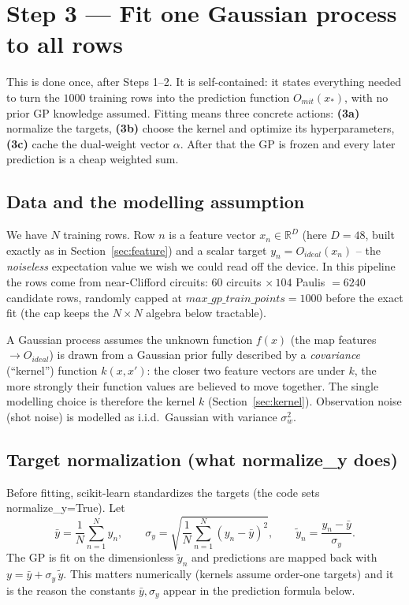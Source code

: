 \documentclass[11pt]{article}
\def\bm#1{#1}%
\def\texttt#1{#1}%
\def\mathrm#1{#1}%
\begin{document}
\section{Step 3 --- Fit one Gaussian process to all rows}
\label{sec:gp}

This is done once, after Steps 1--2. It is self-contained: it states everything
needed to turn the $1000$ training rows into the prediction function
$O_{\mathrm{mit}}(\bm x_*)$, with no prior GP knowledge assumed. Fitting means
three concrete actions: \textbf{(3a)} normalize the targets, \textbf{(3b)} choose
the kernel and optimize its hyperparameters, \textbf{(3c)} cache the dual-weight
vector $\bm\alpha$. After that the GP is frozen and every later prediction is a
cheap weighted sum.

\subsection{Data and the modelling assumption}
We have $N$ training rows. Row $n$ is a feature vector $\bm x_n\in\mathbb{R}^{D}$
(here $D=48$, built exactly as in Section~\ref{sec:feature}) and a scalar target
$y_n=O_{\mathrm{ideal}}(\bm x_n)$ -- the \emph{noiseless} expectation value we
wish we could read off the device. In this pipeline the rows come from
near-Clifford circuits: $60$ circuits $\times\,104$ Paulis $=6240$ candidate
rows, randomly capped at $\texttt{max\_gp\_train\_points}=1000$ before the exact
fit (the cap keeps the $N\times N$ algebra below tractable).

A Gaussian process assumes the unknown function $f(\bm x)$ (the map
features~$\to O_{\mathrm{ideal}}$) is drawn from a Gaussian prior fully described
by a \emph{covariance} (``kernel'') function $k(\bm x,\bm x')$: the closer two
feature vectors are under $k$, the more strongly their function values are
believed to move together. The single modelling choice is therefore the kernel
$k$ (Section~\ref{sec:kernel}). Observation noise (shot noise) is modelled as
i.i.d.\ Gaussian with variance $\sigma_w^2$.

\subsection{Target normalization (what \texttt{normalize\_y} does)}
\label{sec:normalize}
Before fitting, scikit-learn standardizes the targets (the code sets
\texttt{normalize\_y=True}). Let
\begin{equation}
\bar y=\frac1N\sum_{n=1}^N y_n,\qquad
\sigma_y=\sqrt{\frac1N\sum_{n=1}^N (y_n-\bar y)^2},
\qquad
\tilde y_n=\frac{y_n-\bar y}{\sigma_y}.
\label{eq:normy}
\end{equation}
The GP is fit on the dimensionless $\tilde y_n$ and predictions are mapped back
with $y=\bar y+\sigma_y\,\tilde y$. This matters numerically (kernels assume
order-one targets) and it is the reason the constants $\bar y,\sigma_y$ appear in
the prediction formula below.
\end{document}
